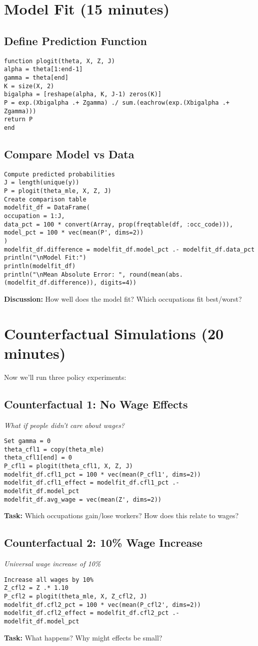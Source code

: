 \documentclass[12pt,english]{article}
\begin{document}
\section{Model Fit (15 minutes)}
\subsection{Define Prediction Function}
\begin{verbatim}
function plogit(theta, X, Z, J)
alpha = theta[1:end-1]
gamma = theta[end]
K = size(X, 2)
bigalpha = [reshape(alpha, K, J-1) zeros(K)]
P = exp.(Xbigalpha .+ Zgamma) ./ sum.(eachrow(exp.(Xbigalpha .+ Zgamma)))
return P
end
\end{verbatim}
\subsection{Compare Model vs Data}
\begin{verbatim}
Compute predicted probabilities
J = length(unique(y))
P = plogit(theta_mle, X, Z, J)
Create comparison table
modelfit_df = DataFrame(
occupation = 1:J,
data_pct = 100 * convert(Array, prop(freqtable(df, :occ_code))),
model_pct = 100 * vec(mean(P', dims=2))
)
modelfit_df.difference = modelfit_df.model_pct .- modelfit_df.data_pct
println("\nModel Fit:")
println(modelfit_df)
println("\nMean Absolute Error: ", round(mean(abs.(modelfit_df.difference)), digits=4))
\end{verbatim}
\textbf{Discussion:} How well does the model fit? Which occupations fit best/worst?
\section{Counterfactual Simulations (20 minutes)}
Now we'll run three policy experiments:
\subsection{Counterfactual 1: No Wage Effects}
\textit{What if people didn't care about wages?}
\begin{verbatim}
Set gamma = 0
theta_cfl1 = copy(theta_mle)
theta_cfl1[end] = 0
P_cfl1 = plogit(theta_cfl1, X, Z, J)
modelfit_df.cfl1_pct = 100 * vec(mean(P_cfl1', dims=2))
modelfit_df.cfl1_effect = modelfit_df.cfl1_pct .- modelfit_df.model_pct
modelfit_df.avg_wage = vec(mean(Z', dims=2))
\end{verbatim}
\textbf{Task:} Which occupations gain/lose workers? How does this relate to wages?
\subsection{Counterfactual 2: 10\% Wage Increase}
\textit{Universal wage increase of 10\%}
\begin{verbatim}
Increase all wages by 10%
Z_cfl2 = Z .* 1.10
P_cfl2 = plogit(theta_mle, X, Z_cfl2, J)
modelfit_df.cfl2_pct = 100 * vec(mean(P_cfl2', dims=2))
modelfit_df.cfl2_effect = modelfit_df.cfl2_pct .- modelfit_df.model_pct
\end{verbatim}
\textbf{Task:} What happens? Why might effects be small?
\end{document}
